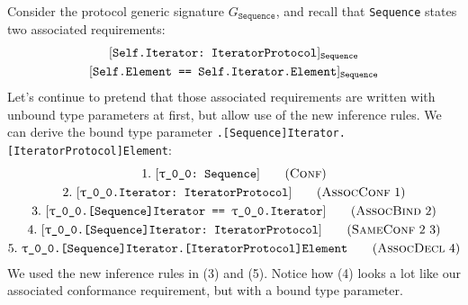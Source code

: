 \documentclass[../generics]{subfiles}
\begin{document}
\begin{example}
Consider the protocol generic signature $G_\texttt{Sequence}$, and recall that \texttt{Sequence} states two associated requirements:
\begin{gather*}
\ConfReq{Self.Iterator}{IteratorProtocol}_\texttt{Sequence}\\
\SameReq{Self.Element}{Self.Iterator.Element}_\texttt{Sequence}
\end{gather*}
Let's continue to pretend that those associated requirements are written with unbound type parameters at first, but allow use of the new inference rules. We can derive the bound type parameter \texttt{\rT.[Sequence]Iterator.[IteratorProtocol]Element}:
\begin{gather*}
\ConfStep{\rT}{Sequence}{1}\\
\AssocConfStep{1}{\rT.Iterator}{IteratorProtocol}{2}\\
\AssocBindStep{2}{\rT.[Sequence]Iterator}{\rT.Iterator}{3}\\
\SameConfStep{2}{3}{\rT.[Sequence]Iterator}{IteratorProtocol}{4}\\
\AssocDeclStep{4}{\rT.[Sequence]Iterator.[IteratorProtocol]Element}{5}
\end{gather*}
We used the new inference rules in (3) and (5). Notice how (4) looks a lot like our associated conformance requirement, but with a bound type parameter.


\end{example}
\end{document}
